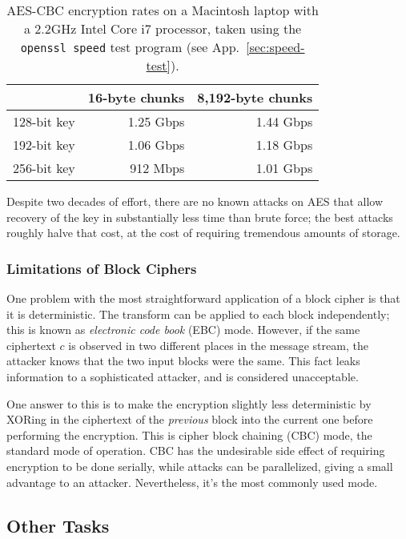 \begin{table}
\begin{tabular}{l | r | r}
            & 16-byte chunks & 8,192-byte chunks \\\hline
128-bit key & 1.25 Gbps & 1.44 Gbps \\
192-bit key & 1.06 Gbps & 1.18 Gbps \\
256-bit key & 912 Mbps & 1.01 Gbps
\end{tabular}
\caption{AES-CBC encryption rates on a Macintosh laptop with a 2.2GHz
  Intel Core i7 processor, taken using the {\tt openssl speed} test
  program (see App.~\ref{sec:speed-test}).}
\label{tab:mac-aes}
\end{table}

Despite two decades of effort, there are no known attacks on AES that
allow recovery of the key in substantially less time than brute force;
the best attacks roughly halve that cost, at the cost of requiring
tremendous amounts of storage. 

\subsubsection{Limitations of Block Ciphers}
\label{sec:limitations}

One problem with the most straightforward application of a block
cipher is that it is deterministic.  The transform can be applied to
each block independently; this is known as \emph{electronic code book}
(EBC) mode.  However, if the same ciphertext $c$ is observed in two
different places in the message stream, the attacker knows that the
two input blocks were the same.  This fact leaks information to a
sophisticated attacker, and is considered unacceptable.

One answer to this is to make the encryption slightly less
deterministic by XORing in the ciphertext of the \emph{previous} block
into the current one before performing the encryption.  This is cipher
block chaining (CBC) mode, the standard mode of operation.    CBC has the
undesirable side effect of requiring encryption to be done serially,
while attacks can be parallelized, giving a small advantage to an
attacker.  Nevertheless, it's the most commonly used mode.

\subsection{Other Tasks}

